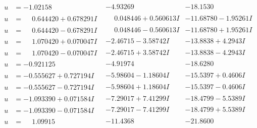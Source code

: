 \documentclass[1p]{elsarticle_modified}
\theoremstyle{definition}
\begin{document}
$$\begin{array}{c|c|c}
\begin{aligned}
u &= -1.02158\phantom{ +0.000000I}\end{aligned}
 & -4.93269\phantom{ +0.000000I} & -18.1530\phantom{ +0.000000I} \\ \hline\begin{aligned}
u &= \phantom{-}0.644420 + 0.678291 I\end{aligned}
 & \phantom{-}0.048446 + 0.560613 I & -11.68780 - 1.95261 I \\ \hline\begin{aligned}
u &= \phantom{-}0.644420 - 0.678291 I\end{aligned}
 & \phantom{-}0.048446 - 0.560613 I & -11.68780 + 1.95261 I \\ \hline\begin{aligned}
u &= \phantom{-}1.070420 + 0.070047 I\end{aligned}
 & -2.46715 - 3.58742 I & -13.8838 + 4.2943 I \\ \hline\begin{aligned}
u &= \phantom{-}1.070420 - 0.070047 I\end{aligned}
 & -2.46715 + 3.58742 I & -13.8838 - 4.2943 I \\ \hline\begin{aligned}
u &= -0.921125\phantom{ +0.000000I}\end{aligned}
 & -4.91974\phantom{ +0.000000I} & -18.6280\phantom{ +0.000000I} \\ \hline\begin{aligned}
u &= -0.555627 + 0.727194 I\end{aligned}
 & -5.98604 - 1.18604 I & -15.5397 + 0.4606 I \\ \hline\begin{aligned}
u &= -0.555627 - 0.727194 I\end{aligned}
 & -5.98604 + 1.18604 I & -15.5397 - 0.4606 I \\ \hline\begin{aligned}
u &= -1.093390 + 0.071584 I\end{aligned}
 & -7.29017 + 7.41299 I & -18.4799 - 5.5389 I \\ \hline\begin{aligned}
u &= -1.093390 - 0.071584 I\end{aligned}
 & -7.29017 - 7.41299 I & -18.4799 + 5.5389 I \\ \hline\begin{aligned}
u &= \phantom{-}1.09915\phantom{ +0.000000I}\end{aligned}
 & -11.4368\phantom{ +0.000000I} & -21.8600\phantom{ +0.000000I} \\ \hline\begin{aligned}

\end{aligned}
\end{array}$$
\end{document}
